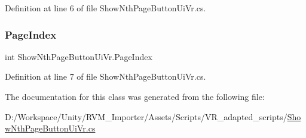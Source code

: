 Definition at line 6 of file Show\+Nth\+Page\+Button\+Ui\+Vr.\+cs.

\mbox{\label{class_show_nth_page_button_ui_vr_ad2b4444240bad6736dbeef14943771c2}} 
\subsubsection{\texorpdfstring{PageIndex}{PageIndex}}
{\footnotesize\ttfamily int Show\+Nth\+Page\+Button\+Ui\+Vr.\+Page\+Index}



Definition at line 7 of file Show\+Nth\+Page\+Button\+Ui\+Vr.\+cs.



The documentation for this class was generated from the following file\+:\begin{DoxyCompactItemize}
\item 
D\+:/\+Workspace/\+Unity/\+R\+V\+M\+\_\+\+Importer/\+Assets/\+Scripts/\+V\+R\+\_\+adapted\+\_\+scripts/\mbox{\hyperlink{_show_nth_page_button_ui_vr_8cs}{Show\+Nth\+Page\+Button\+Ui\+Vr.\+cs}}\end{DoxyCompactItemize}
